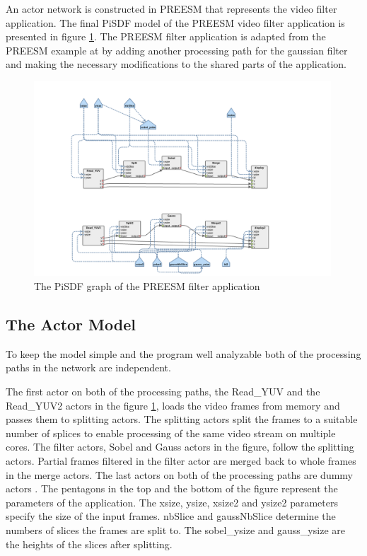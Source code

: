 An actor network is constructed in PREESM that represents the video filter application. The final PiSDF model of the PREESM video filter application is presented in figure \ref{fig:preesm_actors}. The PREESM filter application is adapted from the PREESM example at \cite{preesmtut} by adding another processing path for the gaussian filter and making the necessary modifications to the shared parts of the application.

\begin{figure}[h!]
    \begin{center}
        \includegraphics[width=0.99\textwidth]{images/preesm_diagram.png}
        \caption{The PiSDF graph of the PREESM filter application}
        \label{fig:preesm_actors}
    \end{center}
\end{figure}

\subsection{The Actor Model}
\label{subsec:actors}
To keep the model simple and the program well analyzable both of the processing paths in the network are independent. 

The first actor on both of the processing paths, the Read\_YUV and the Read\_YUV2 actors in the figure \ref{fig:preesm_actors}, loads the video frames from memory and passes them to splitting actors. The splitting actors split the frames to a suitable number of splices to enable processing of the same video stream on multiple cores. The filter actors, Sobel and Gauss actors in the figure, follow the splitting actors. Partial frames filtered in the filter actor are merged back to whole frames in the merge actors. The last actors on both of the processing paths are dummy actors . The pentagons in the top and the bottom of the figure represent the parameters of the application. The xsize, ysize, xsize2 and ysize2 parameters specify the size of the input frames. nbSlice and gaussNbSlice determine the numbers of slices the frames are split to. The sobel\_ysize and gauss\_ysize are the heights of the slices after splitting.

